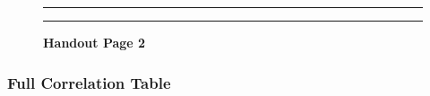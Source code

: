 \documentclass[]{article}
\begin{document}
\begin{figure}[!ht]
    \hrule
    \caption{ \textbf{Handout Page 2} }
    \begin{center}
    \end{center}
    \label{fig:handout-2}
    \hrule
\end{figure}

\newpage

\newpage
\subsubsection{Full Correlation Table}
\label{sec:appendix-corr-table}
\end{document}
